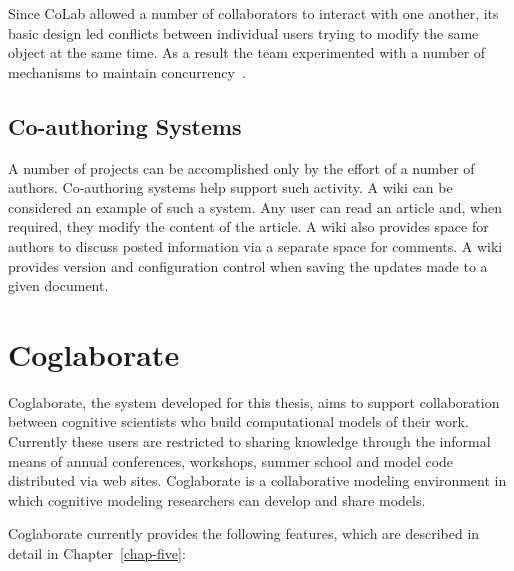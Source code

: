 Since CoLab allowed a number of collaborators to interact with one
another, its basic design led conflicts between individual users
trying to modify the same object at the same time.  As a result the
team experimented with a number of mechanisms to maintain
concurrency~\cite{Stefik:1987:BCU}.


\subsection{Co-authoring Systems}

A number of projects can be accomplished only by the effort of a
number of authors. Co-authoring systems help support such activity. A
wiki can be considered an example of such a system. Any user can read
an article and, when required, they modify the content of the
article. A wiki also provides space for authors to discuss posted
information via a separate space for comments. A wiki provides version
and configuration control when saving the updates made to a given
document.

\section{Coglaborate}


Coglaborate, the system developed for this thesis, aims to support
collaboration between cognitive scientists who build computational
models of their work.  Currently these users are restricted to sharing
knowledge through the informal means of annual conferences, workshops,
summer school and model code distributed via web sites.  Coglaborate
is a collaborative modeling environment in which cognitive modeling
researchers can develop and share models.



Coglaborate currently provides the following features, which are
described in detail in Chapter~\ref{chap-five}:


